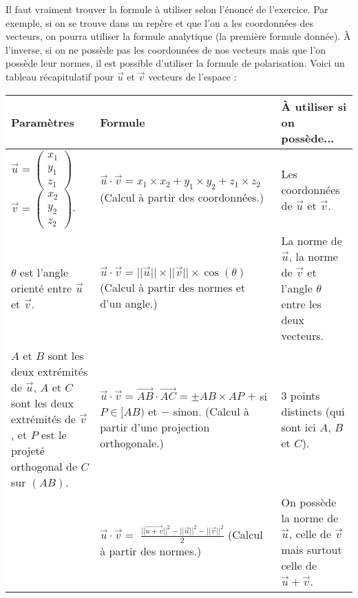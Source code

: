 	\begin{tip}
		Il faut vraiment trouver la formule à utiliser selon l'énoncé de l'exercice.
		\newpar
		Par exemple, si on se trouve dans un repère et que l'on a les coordonnées des vecteurs, on pourra utiliser la formule analytique (la première formule donnée).
		À l'inverse, si on ne possède pas les coordonnées de nos vecteurs mais que l'on possède leur normes, il est possible d'utiliser la formule de polarisation.
		\newpar
		Voici un tableau récapitulatif pour $\overrightarrow{u}$ et $\overrightarrow{v}$ vecteurs de l'espace :
		\newpar
		\colorbox{white}{%
			\begin{tabularx}{\textwidth}{|X|X|X|}
				\hline
				\textbf{Paramètres} & \textbf{Formule} & \textbf{À utiliser si on possède...} \\
				\hline
				\rule[-2.5ex]{0pt}{7ex}
				$\overrightarrow{u} = \begin{pmatrix} {x_1} \\ {y_1} \\ {z_1} \end{pmatrix}$ \medskip $\overrightarrow{v} = \begin{pmatrix} {x_2} \\ {y_2} \\ {z_2} \end{pmatrix}$. & $\overrightarrow{u} \cdot \overrightarrow{v} = x_1 \times x_2 + y_1 \times y_2 + z_1 \times z_2$ \medskip (Calcul à partir des coordonnées.) & Les coordonnées de $\overrightarrow{u}$ et $\overrightarrow{v}$. \\
				\hline
				\rule[-2.5ex]{0pt}{7ex}
				$\theta$ est l'angle orienté entre $\overrightarrow{u}$ et $\overrightarrow{v}$. & $\overrightarrow{u} \cdot \overrightarrow{v} = ||\overrightarrow{u}|| \times ||\overrightarrow{v}|| \times \cos(\theta)$ \medskip (Calcul à partir des normes et d'un angle.) & La norme de $\overrightarrow{u}$, la norme de $\overrightarrow{v}$ et l'angle $\theta$ entre les deux vecteurs. \\
				\hline
				\rule[-2.5ex]{0pt}{7ex}
				$A$ et $B$ sont les deux extrémités de $\overrightarrow{u}$, $A$ et $C$ sont les deux extrémités de $\overrightarrow{v}$, et $P$ est le projeté orthogonal de $C$ sur $(AB)$. & $\overrightarrow{u} \cdot \overrightarrow{v} = \overrightarrow{AB} \cdot \overrightarrow{AC} = \pm AB \times AP$ \medskip $+$ si $P \in [AB)$ et $-$ sinon. \medskip (Calcul à partir d'une projection orthogonale.) & 3 points distincts (qui sont ici $A$, $B$ et $C$). \\
				\hline
				\rule[-2.5ex]{0pt}{7ex}
				& $\displaystyle{\overrightarrow{u} \cdot \overrightarrow{v} =}$
				\smallskip
				$\displaystyle{\frac{||\overrightarrow{u + v}||^2 - ||\overrightarrow{u}||^2 - ||\overrightarrow{v}||^2}{2}}$ \medskip (Calcul à partir des normes.) & On possède la norme de $\overrightarrow{u}$, celle de $\overrightarrow{v}$ mais surtout celle de $\overrightarrow{u} + \overrightarrow{v}$. \\
				\hline
			\end{tabularx}%
		}
	\end{tip}


